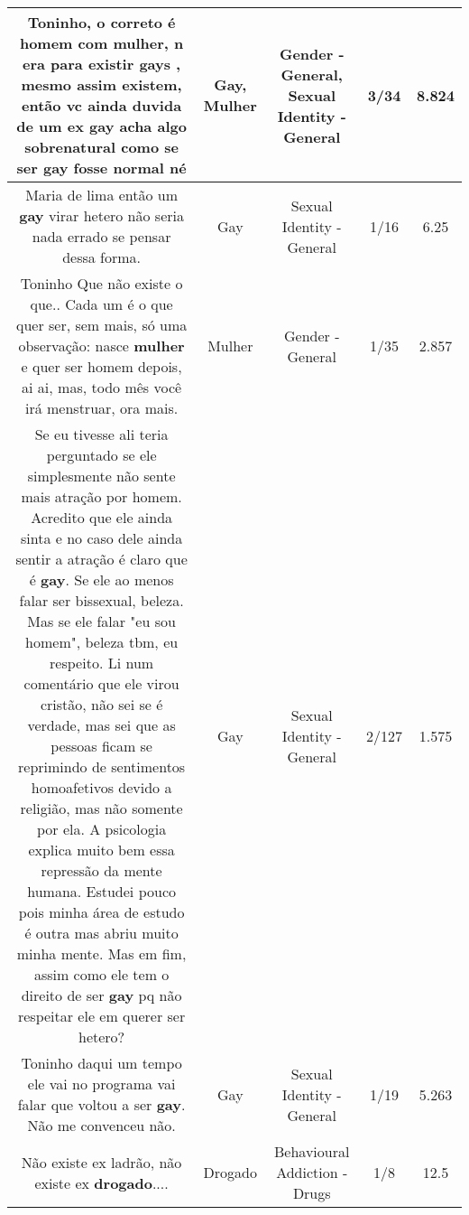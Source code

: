 \documentclass[11pt]{article}
\newlength\mylength
\begin{document}
\begin{center}
\begin{longtable}{|C{.65\mylength}|C{.30\mylength}|C{.12\mylength}|C{.12\mylength}|C{.12\mylength}|}
  \small Toninho, o correto é homem com \textbf{mulher}, n era para existir gays , mesmo assim existem, então vc ainda  duvida de um ex \textbf{gay} acha algo sobrenatural como se ser \textbf{gay} fosse normal né\normalsize   & Gay, Mulher & Gender - General, Sexual Identity - General & 3/34 & 8.824 \\  \hline
  \small Maria de lima então um \textbf{gay} virar hetero não seria nada errado se pensar dessa forma.\normalsize   & Gay & Sexual Identity - General & 1/16 & 6.25 \\  \hline
  \small Toninho Que não existe o que.. Cada um é o que quer ser, sem mais, só uma observação: nasce \textbf{mulher} e quer ser homem depois, ai ai, mas, todo mês você irá menstruar, ora mais.\normalsize   & Mulher & Gender - General & 1/35 & 2.857 \\  \hline
  \small Se eu tivesse ali teria perguntado se ele simplesmente não sente mais atração por homem. Acredito que ele ainda sinta e no caso dele ainda sentir a atração é claro que é \textbf{gay}. Se ele ao menos falar ser bissexual, beleza. Mas se ele falar "eu sou homem", beleza tbm, eu respeito. Li num comentário que ele virou cristão, não sei se é verdade, mas sei que as pessoas ficam se reprimindo de sentimentos homoafetivos devido a religião, mas não somente por ela. A psicologia explica muito bem essa repressão da mente humana. Estudei pouco pois minha área de estudo é outra mas abriu muito minha mente. Mas em fim, assim como ele tem o direito de ser \textbf{gay} pq não respeitar ele em querer ser hetero?\normalsize   & Gay & Sexual Identity - General & 2/127 & 1.575 \\  \hline
  \small Toninho daqui um tempo ele vai no programa vai falar que voltou a ser \textbf{gay}. Não me convenceu não.\normalsize   & Gay & Sexual Identity - General & 1/19 & 5.263 \\  \hline
  \small Não existe ex ladrão,  não existe ex \textbf{drogado}....\normalsize   & Drogado & Behavioural Addiction - Drugs & 1/8 & 12.5 \\  \hline

\end{longtable}
\end{center}
\end{document}
